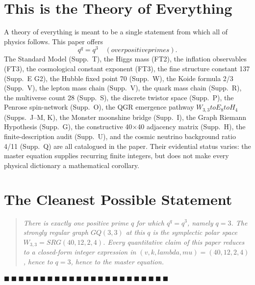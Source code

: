 \documentclass[12pt,a4paper]{article}
\def\mathrm#1{#1}%
\def\text#1{#1}%
\def\lambda{lambda}%
\def\mu{mu}%
\def\to{ to }%
\theoremstyle{definition}
\newcommand{\SRG}{\mathrm{SRG}}
\newcommand{\GQ}{\mathrm{GQ}}
\begin{document}
\section*{This is the Theory of Everything}

A theory of everything is meant to be a single statement from which
all of physics follows. This paper offers
\[
\boxed{\;q^q = q^3 \quad\text{(over positive primes)}.\;}
\]
The Standard Model (Supp.~T), the Higgs mass (FT2), the inflation
observables (FT3), the cosmological constant exponent (FT3), the fine
structure constant 137 (Supp.~E G2), the Hubble fixed point 70
(Supp.~W), the Koide formula 2/3 (Supp.~V), the lepton mass chain
(Supp.~V), the quark mass chain (Supp.~R), the multiverse count 28
(Supp.~S), the discrete twistor space (Supp.~P), the Penrose
spin-network (Supp.~O), the QGR emergence pathway $W_{3,3}\to E_8\to H_4$
(Supps.\ J--M, K), the Monster moonshine bridge (Supp.~I), the Graph
Riemann Hypothesis (Supp.~G), the constructive 40$\times$40 adjacency
matrix (Supp.~H), the finite-description audit (Supp.~U), and
the cosmic neutrino background ratio 4/11 (Supp.~Q) are all catalogued
in the paper.  Their evidential status varies: the master equation
supplies recurring finite integers, but does not make every physical
dictionary a mathematical corollary.

\section*{The Cleanest Possible Statement}

\begin{quote}\em
There is exactly one positive prime $q$ for which $q^q = q^3$,
namely $q = 3$. The strongly regular graph $\GQ(3,3)$ at this $q$
is the symplectic polar space $W_{3,3} = \SRG(40,12,2,4)$. Every
quantitative claim of this paper reduces to a closed-form integer
expression in $(v,k,\lambda,\mu) = (40,12,2,4)$, hence to $q=3$,
hence to the master equation.
\end{quote}

\hfill $\blacksquare\ \blacksquare\ \blacksquare\ \blacksquare\ \blacksquare\ \blacksquare\ \blacksquare\ \blacksquare\ \blacksquare\ \blacksquare\ \blacksquare\ \blacksquare\ \blacksquare\ \blacksquare\ \blacksquare\ \blacksquare\ \blacksquare\ \blacksquare\ \blacksquare\ \blacksquare\ \blacksquare\ \blacksquare\ \blacksquare$

\clearpage
\end{document}
